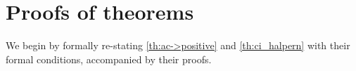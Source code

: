 \documentclass[anon,12pt]{clear2026} %
\begin{document}

\section{Proofs of theorems}
\label{app:proofs}


We begin by formally re-stating \cref{th:ac->positive} and \cref{th:ci_halpern} with their formal conditions, accompanied by their proofs.
\end{document}
